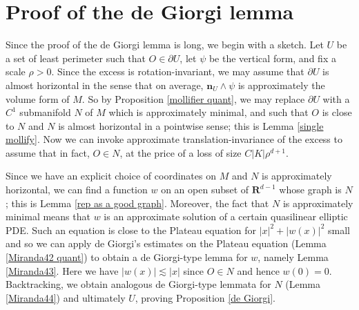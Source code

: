 \documentclass[reqno,10pt]{amsart}
\newcommand{\RR}{\mathbf{R}}
\newcommand{\normal}{\mathbf n}
\theoremstyle{definition}
\numberwithin{equation}{section}
\begin{document}


\section{Proof of the de Giorgi lemma}\label{proof of De Giorgi}
Since the proof of the de Giorgi lemma is long, we begin with a sketch.
Let $U$ be a set of least perimeter such that $O \in \partial U$, let $\psi$ be the vertical form, and fix a scale $\rho > 0$.
Since the excess is rotation-invariant, we may assume that $\partial U$ is almost horizontal in the sense that on average, $\normal_U \wedge \psi$ is approximately the volume form of $M$.
So by Proposition \ref{mollifier quant}, we may replace $\partial U$ with a $C^1$ submanifold $N$ of $M$ which is approximately minimal, and such that $O$ is close to $N$ and $N$ is almost horizontal in a pointwise sense; this is Lemma \ref{single mollify}.
Now we can invoke approximate translation-invariance of the excess to assume that in fact, $O \in N$, at the price of a loss of size $C|K|\rho^{d + 1}$.

Since we have an explicit choice of coordinates on $M$ and $N$ is approximately horizontal, we can find a function $w$ on an open subset of $\RR^{d - 1}$ whose graph is $N$; this is Lemma \ref{rep as a good graph}.
Moreover, the fact that $N$ is approximately minimal means that $w$ is an approximate solution of a certain quasilinear elliptic PDE.
Such an equation is close to the Plateau equation for $|x|^2 + |w(x)|^2$ small and so we can apply de Giorgi's estimates on the Plateau equation (Lemma \ref{Miranda42 quant}) to obtain a de Giorgi-type lemma for $w$, namely Lemma \ref{Miranda43}.
Here we have $|w(x)| \lesssim |x|$ since $O \in N$ and hence $w(0) = 0$.
Backtracking, we obtain analogous de Giorgi-type lemmata for $N$ (Lemma \ref{Miranda44}) and ultimately $U$, proving Proposition \ref{de Giorgi}.
\end{document}
